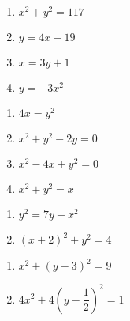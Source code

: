 \begin{multicols}{4} 

\begin{enumerate}

\setcounter{enumi}{\value{HW}}

\item $x^{2} + y^{2} = 117$
\item $y = 4x - 19$
\item $x = 3y + 1$
\item $y = -3x^{2}$

\setcounter{HW}{\value{enumi}}

\end{enumerate}

\end{multicols}

\begin{multicols}{4} 

\begin{enumerate}

\setcounter{enumi}{\value{HW}}

\item $4x = y^2$
\item $x^2 + y^2 - 2y = 0$
\item $x^2 -4x + y^2 = 0$
\item $x^2 + y^2 = x$

\setcounter{HW}{\value{enumi}}

\end{enumerate}

\end{multicols}

\begin{multicols}{2} 

\begin{enumerate}

\setcounter{enumi}{\value{HW}}

\item $y^2 = 7y - x^2$
\item $(x+2)^2 + y^2 = 4$

\setcounter{HW}{\value{enumi}}

\end{enumerate}

\end{multicols}

\begin{multicols}{2} 

\begin{enumerate}

\setcounter{enumi}{\value{HW}}

\item $x^{2} + (y - 3)^{2} = 9$ 
\item $4x^2 + 4\left( y - \dfrac{1}{2} \right)^2 = 1$ \label{equrecttopolarlast}

\setcounter{HW}{\value{enumi}}

\end{enumerate}

\end{multicols}

